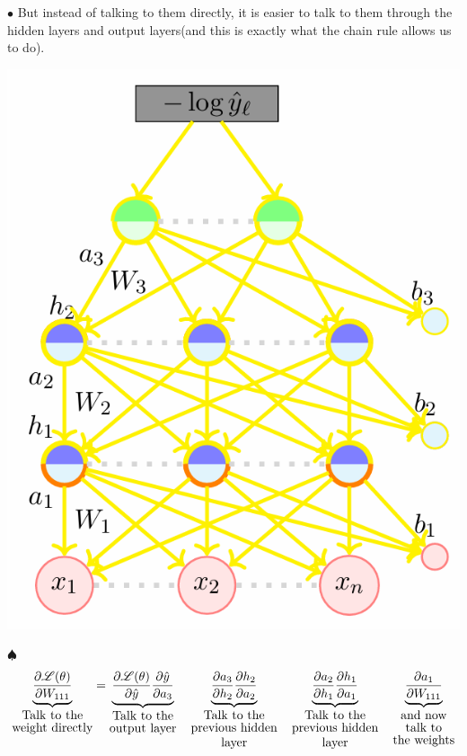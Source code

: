 \documentclass[11pt, a4paper]{article}
\begin{document}
\noindent
\begin{minipage}{0.5\textwidth}
    $\bullet$ But instead of talking to them directly, it is easier to talk to them through the hidden layers and output layers(and this is exactly what the chain rule allows us to do).
\end{minipage}
\hfill
\begin{minipage}{0.45\textwidth}
    \includegraphics[scale = 0.5]{image_8.png}
\end{minipage}


$\spadesuit$ $$\underbrace{\dfrac{\partial \mathscr{L}(\theta)}{\partial W_{111}}}_{\shortstack{Talk to the\\weight directly}}
=
\underbrace{\dfrac{\partial \mathscr{L}(\theta)}{\partial \hat{y}} \dfrac{\partial \hat{y}}{\partial a_3}}_{\shortstack{Talk to the\\output layer}} \,\,\,\,\,\,
\underbrace{\dfrac{\partial a_3}{\partial h_2} \dfrac{\partial h_2}{\partial a_2}}_{\shortstack{Talk to the\\previous hidden\\layer}} \,\,\,\,\,\,
\underbrace{\dfrac{\partial a_2}{\partial h_1} \dfrac{\partial h_1}{\partial a_1}}_{\shortstack{Talk to the\\previous hidden\\layer}} \,\,\,\,\,\,
\underbrace{\dfrac{\partial a_1}{\partial W_{111}}}_{\shortstack{and now\\talk to\\the weights}}$$
\end{document}
